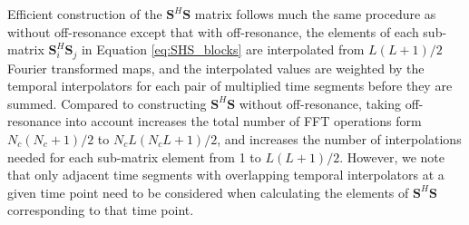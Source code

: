 Efficient construction of the $\bm{S}^{H}\bm{S}$ matrix follows much the same procedure as without
off-resonance except that with off-resonance,
the elements of each sub-matrix $\bm{S}_i^{H}\bm{S}_j$ in Equation \ref{eq:SHS_blocks}
are interpolated from $L(L+1)/2$ Fourier transformed maps,
and the interpolated values are weighted by the temporal interpolators for each pair of multiplied time segments before they 
are summed.
Compared to constructing $\bm{S}^H\bm{S}$ without off-resonance, 
taking off-resonance into account increases the total number of FFT operations form $N_c(N_c+1)/2$ to $N_cL(N_cL+1)/2$, 
and increases the number of interpolations needed for each sub-matrix element from 1 to $L(L+1)/2$.  
However, we note that only adjacent time segments with overlapping temporal interpolators at a given time point
need to be considered when calculating the elements of $\bm{S}^H\bm{S}$ corresponding to that time point. 



